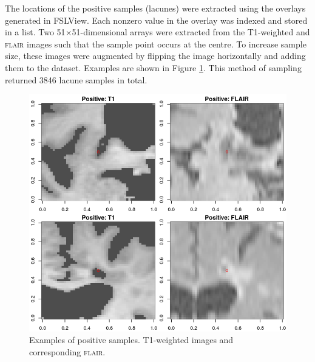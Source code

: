 The locations of the positive samples (lacunes) were extracted using the overlays generated in FSLView. Each nonzero value in the overlay was indexed and stored in a list. Two 51$\times$51-dimensional arrays were extracted from the T1-weighted and \textsc{flair} images such that the sample point occurs at the centre. To increase sample size, these images were augmented by flipping the image horizontally and adding them to the dataset. Examples are shown in Figure \ref{data-positives}. This method of sampling returned 3846 lacune samples in total.

\begin{figure}[ht]
\centering
\includegraphics[width=\linewidth]{Images/6_positives.png}
\caption{Examples of positive samples. T1-weighted images and corresponding \textsc{flair}.}
\label{data-positives}
\end{figure}


